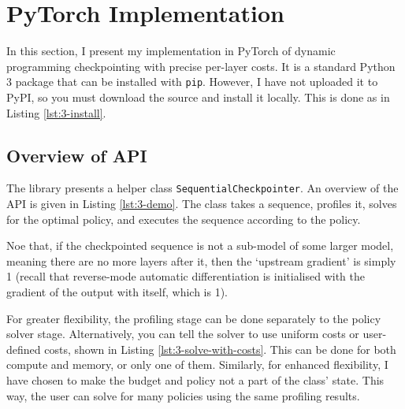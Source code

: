 \section{PyTorch Implementation} \label{sec:3-pytorch-impl}
In this section, I present my implementation in PyTorch of dynamic programming checkpointing with precise per-layer costs.
It is a standard Python 3 package that can be installed with \texttt{pip}.
However, I have not uploaded it to PyPI, so you must download the source and install it locally.
This is done as in Listing \ref{lst:3-install}.


\subsection{Overview of API}
The library presents a helper class \texttt{SequentialCheckpointer}.
An overview of the API is given in Listing \ref{lst:3-demo}.
The class takes a sequence, profiles it, solves for the optimal policy, and executes the sequence according to the policy.


Noe that, if the checkpointed sequence is not a sub-model of some larger model, meaning there are no more layers after it, then the `upstream gradient' is simply 1 (recall that reverse-mode automatic differentiation is initialised with the gradient of the output with itself, which is 1).

For greater flexibility, the profiling stage can be done separately to the policy solver stage.
Alternatively, you can tell the solver to use uniform costs or user-defined costs, shown in Listing \ref{lst:3-solve-with-costs}.
This can be done for both compute and memory, or only one of them.
Similarly, for enhanced flexibility, I have chosen to make the budget and policy not a part of the class' state.
This way, the user can solve for many policies using the same profiling results.

